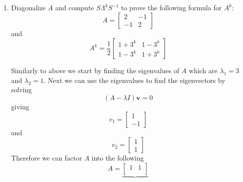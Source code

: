 \begin{enumerate}[label=\arabic*.]
    \item Diagonalize $A$ and compute $S \Lambda^{k} S^{-1}$ to prove the
        following formula for $A^{k}$:
        \begin{equation}
            A =
            \begin{bmatrix}
                2 & -1\\
                -1 & 2
            \end{bmatrix}
        \end{equation}
        and 
        \begin{equation}
            A^{k} =
            \frac{1}{2}
            \begin{bmatrix}
                1 + 3^{k} & 1-3^{k} \\
                1-3^{k} & 1+3^{k}
            \end{bmatrix}
        \end{equation}
        \begin{mdframed}[style=MyFrame]
            Similarly to above we start by finding the eigenvalues of $A$
            which are $\lambda_{1}=3$ and $\lambda_{2} = 1$. Next we can
            use the eigenvalues to find the eigenvectors by solving
            \begin{equation}
                \left( A - \lambda I\right)\mathbf{v} = 0
            \end{equation}
            giving
            \begin{equation}
                v_{1} = 
                \begin{bmatrix}
                    1       \\
                    -1      
                \end{bmatrix}
            \end{equation}
            and 
            \begin{equation}
                v_{2} = 
                \begin{bmatrix}
                    1       \\
                    1      
                \end{bmatrix}
            \end{equation}
            Therefore we can factor $A$ into the following
            \begin{equation}
                A = 
                \underbrace{
                    \begin{bmatrix}
                        1       &   1       \\

\end{bmatrix}}
\end{equation}
\end{mdframed}
\end{enumerate}
